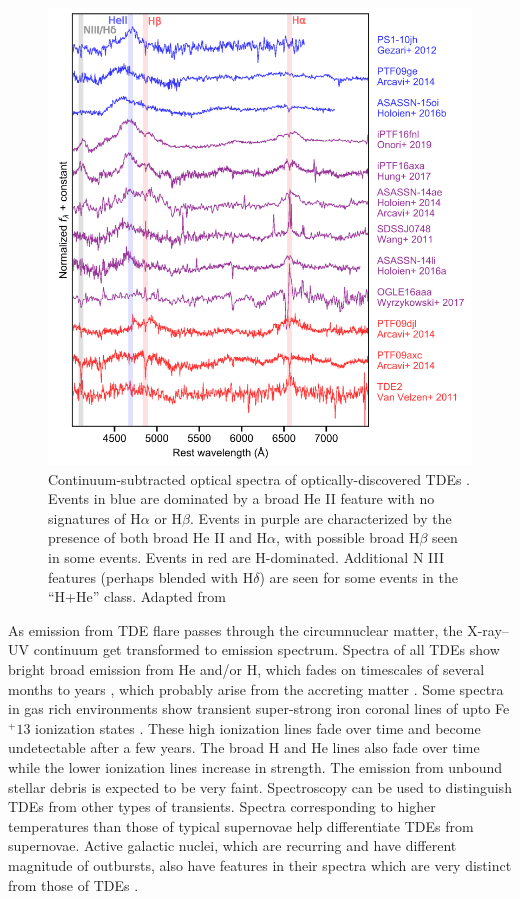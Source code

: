 \documentclass{tda}
\begin{document}
\begin{figure}
	\centering
	\captionsetup{width=.85\linewidth}
	\includegraphics[width=.5\linewidth]{./images/arcavi2014.png}
	\caption{Continuum-subtracted optical spectra of optically-discovered TDEs \cite{arcavi_continuum_2014}. Events in blue are dominated by
a broad He II feature with no signatures of H\(\alpha\) or H\(\beta\). Events in purple
are characterized by the presence of both broad He II and H\(\alpha\), with possible broad H\(\beta\) seen in some events.
Events in red are H-dominated. Additional N III features (perhaps blended with
H\(\delta\)) are seen for some events in the “H+He” class. Adapted from \cite{van_velzen_optical-ultraviolet_2020}}
\end{figure}

As emission from TDE flare passes through the circumnuclear matter, the X-ray--UV continuum get transformed to emission spectrum. Spectra of all TDEs show bright broad emission from He and/or H, which fades on timescales of several months to years \cite{komossa_tidal_2015, wang_transient_2011}, which probably arise from the accreting matter \cite{guillochon_hydrodynamical_2013, komossa_tidal_2015}. Some spectra in gas rich environments show transient super-strong iron coronal lines of upto Fe\(^+13\) ionization states \cite{wang_transient_2011}. These high ionization lines fade over time and become undetectable after a few years. The broad H and He lines also fade over time while the lower ionization lines increase in strength. The emission from unbound stellar debris is expected to be very faint.
Spectroscopy can be used to distinguish TDEs from other types of transients. Spectra corresponding to higher temperatures than those of typical supernovae help differentiate TDEs from supernovae. Active galactic nuclei, which are recurring and have different magnitude of outbursts, also have features in their spectra which are very distinct from those of TDEs \cite{arcavi_continuum_2014}.
\end{document}
